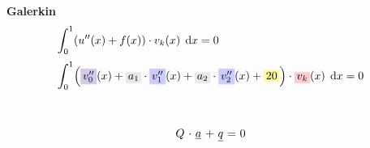\documentclass[
final,
a4paper,
oneside,
parskip=full,
headings=standardclasses,
headings=big,
pointednumbers,
fleqn
]{scrartcl}
\newcommand{\tfillb}[1]{\tfillc[#1][blue!20]}
\newcommand{\tfilly}[1]{\tfillc[#1][yellow!40]}
\newcommand{\tfillr}[1]{\tfillc[#1][red!20]}
\newcommand{\tfillv}[1]{\tfillc[#1][Violet!20]}
\newcommand{\tfillgr}[1]{\tfillc[#1][Gray!20]}
\newcommand*\difx{\; \mathop{}\!\mathrm{d}x}
\newcommand{\kl}[1]{{\left( #1 \right)}}
\begin{document}
    \newpage
    {\bf{Galerkin}} \\
    {\setlength{\abovedisplayskip}{-6pt}
    \setlength{\belowdisplayskip}{-12pt}
    \begin{align*}
        \int_{0}^{1}&{\kl{u''\kl{x} + f\kl{x}} \cdot v_k\kl{x} \difx} = 0  \\[0.1cm]
        \int_{0}^{1}&{\kl{\tfillv{$v_0''$}\kl{x}   + \tfillgr{$a_1$} \cdot \tfillb{$v_1''$}\kl{x}   + \tfillgr{$a_2$} \cdot \tfillb{$v_2''$}\kl{x} + \tfilly{$20$}} \cdot \tfillr{$v_k$}\kl{x} \difx} = 0  \\[0.1cm]
    \end{align*}} \\
    \begin{comment}
    \begin{bmatrix}
    \int\limits_{0}^{1}{\tfillb{$v_1''$}\kl{x} \cdot \tfillr{$v_1$}\kl{x} \difx} &
    \int\limits_{0}^{1}{\tfillb{$v_2''$}\kl{x} \cdot \tfillr{$v_1$}\kl{x} \difx} \\
    \int\limits_{0}^{1}{\tfillb{$v_1''$}\kl{x} \cdot \tfillr{$v_2$}\kl{x} \difx} & 
    \int\limits_{0}^{1}{\tfillb{$v_2''$}\kl{x} \cdot \tfillr{$v_2$}\kl{x} \difx} \\
    \end{bmatrix} & \cdot &
    \begin{pmatrix}
    a_1 \\
    a_2
    \end{pmatrix} & + & 
    \begin{pmatrix}
    \int\limits_{0}^{1}{\tfillv{$v_0''$}\kl{x} \cdot \tfillr{$v_1$}\kl{x} \difx} + \int\limits_{0}^{1}{\tfilly{$20$}\kl{x} \cdot \tfillr{$v_1$}\kl{x} \difx} \\
    \int\limits_{0}^{1}{\tfillv{$v_0''$}\kl{x} \cdot \tfillr{$v_1$}\kl{x} \difx} + \int\limits_{0}^{1}{\tfilly{$20$}\kl{x} \cdot \tfillr{$v_1$}\kl{x} \difx}
    \end{pmatrix} & = & 0
    \end{comment}
    {\setlength{\abovedisplayskip}{-6pt}
    \setlength{\belowdisplayskip}{-12pt}
    \begin{align*}
        \begin{array}{r@{\ }c@{\ }c@{\ }c@{\ }c@{\ }c@{\ }l}
            Q & \cdot & \uline{a} & + & \uline{q} & = & 0
        \end{array}
    \end{align*}} \\
\end{document}
